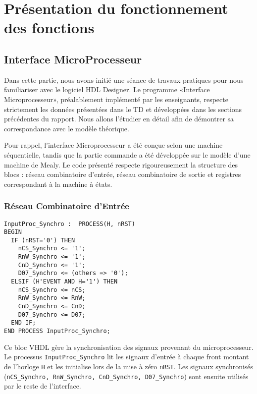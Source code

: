 \section{Présentation du fonctionnement des fonctions}

\subsection{Interface MicroProcesseur}

Dans cette partie, nous avons initié une séance de travaux pratiques pour nous familiariser avec 
le logiciel HDL Designer. Le programme «Interface Microprocesseur», préalablement implémenté par 
les enseignants, respecte strictement les données présentées dans le TD et développées dans les 
sections précédentes du rapport. Nous allons l’étudier en détail afin de démontrer sa correspondance 
avec le modèle théorique.
\newline

Pour rappel, l’interface Microprocesseur a été conçue selon une machine séquentielle, tandis que 
la partie commande a été développée sur le modèle d’une machine de Mealy. Le code présenté respecte 
rigoureusement la structure des blocs : réseau combinatoire d’entrée, réseau combinatoire de sortie 
et registres correspondant à la machine à états.
\newline

\subsubsection{Réseau Combinatoire d’Entrée}

\begin{lstlisting}[style=VHDLStyle, caption={Reseau Cominatoire d'entrée}]
InputProc_Synchro :  PROCESS(H, nRST)
BEGIN
  IF (nRST='0') THEN 
    nCS_Synchro <= '1';
    RnW_Synchro <= '1';
    CnD_Synchro <= '1';
    D07_Synchro <= (others => '0');
  ELSIF (H'EVENT AND H='1') THEN
    nCS_Synchro <= nCS;
    RnW_Synchro <= RnW;
    CnD_Synchro <= CnD;
    D07_Synchro <= D07;
  END IF;
END PROCESS InputProc_Synchro;
\end{lstlisting}

Ce bloc VHDL gère la synchronisation des signaux provenant du microprocesseur. Le processus \texttt{InputProc\_Synchro} lit les signaux d’entrée à chaque front montant de l’horloge \texttt{H} et les initialise lors de la mise à zéro \texttt{nRST}. Les signaux synchronisés (\texttt{nCS\_Synchro, RnW\_Synchro, CnD\_Synchro, D07\_Synchro}) sont ensuite utilisés par le reste de l’interface.

